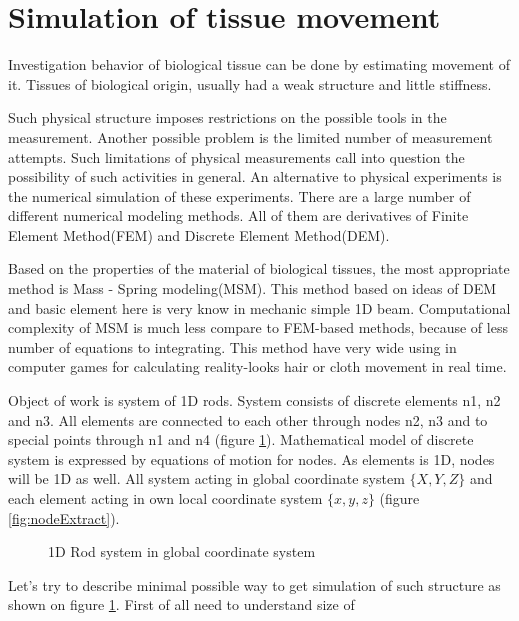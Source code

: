 \chapter*{Simulation of tissue movement} 
Investigation behavior of biological tissue can be done by estimating movement
of it. Tissues of biological origin, usually had a weak structure and little
stiffness.
\par
Such physical structure imposes restrictions on the possible tools in the
measurement. Another possible problem is the limited number of measurement
attempts. Such limitations of physical measurements call into question the
possibility of such activities in general. An alternative to physical
experiments is the numerical simulation of these experiments. There are a large
number of different numerical modeling methods. All of them are derivatives of
Finite Element Method(FEM) and Discrete Element Method(DEM).
\par
Based on the properties of the material of biological tissues, the most
appropriate method is Mass - Spring modeling(MSM). This method based on ideas of
DEM and basic element here is very know in mechanic simple 1D beam.
Computational complexity of MSM is much less compare to FEM-based methods,
because of less number of equations to integrating. This method have very wide
using in computer games for calculating reality-looks hair or cloth movement in
real time. 
\par
Object of work is system of 1D rods. System consists of discrete elements n1, n2
and n3. All elements are connected to each other through nodes n2, n3 and to
special points through n1 and n4 (figure \ref{fig:rodSystem}). Mathematical
model of discrete system is expressed by equations of motion for nodes. As
elements is 1D, nodes will be 1D as well. All system acting in global coordinate
system $\{X, Y, Z\}$ and each element acting in own local coordinate system
$\{x,y,z\}$ (figure \ref{fig:nodeExtract}).\par
\begin{figure}[ht]
  \centering
      
  \caption{1D Rod system in global coordinate system}\label{fig:rodSystem}      
\end{figure}
Let's try to describe minimal possible way to get simulation of such structure as
 shown on figure \ref{fig:rodSystem}. First of all need to understand size of 
